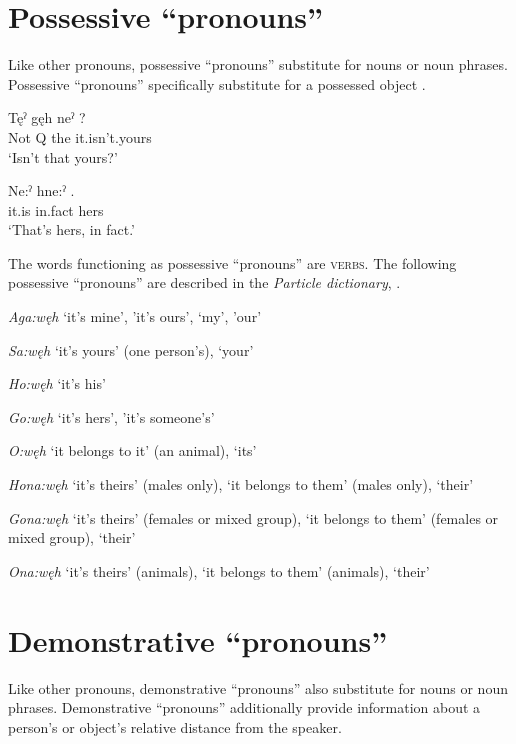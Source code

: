 \section{Possessive “pronouns”} \label{ch:’Possessive pronouns’}
Like other pronouns, possessive “pronouns” substitute for nouns or noun phrases. Possessive “pronouns” specifically substitute for a possessed object . 

\ea\label{ex:poss}
\ea 
 \gll Tęˀ gęh neˀ ? \\
Not Q the it.isn’t.yours\\
\glt ‘Isn’t that yours?’

\ex 
 \gll Ne:ˀ hne:ˀ .\\
it.is in.fact hers\\
\glt ‘That’s hers, in fact.’
\z
\z 

The words functioning as possessive “pronouns” are \textsc{verbs}. The following possessive “pronouns” are described in the \textit{Particle dictionary}, . 

\begin{CayugaRelated}

\item{} \textit{Aga:węh} ‘it's mine’, 'it's ours’, ‘my', 'our’\\
\item{} \textit{Sa:węh} ‘it's yours’ (one person’s), ‘your’\\
\item{} \textit{Ho:węh} ‘it's his’\\
\item{} \textit{Go:węh} ‘it's hers’, 'it's someone’s’\\
\item{} \textit{O:węh} ‘it belongs to it’ (an animal), ‘its’\\
\item{} \textit{Hona:węh} ‘it's theirs’ (males only), ‘it belongs to them’ (males only), ‘their’\\
\item{} \textit{Gona:węh} ‘it's theirs’ (females or mixed group), ‘it belongs to them’ (females or mixed group), ‘their’\\
\item{} \textit{Ona:węh} ‘it's theirs’ (animals), ‘it belongs to them’ (animals), ‘their’
\end{CayugaRelated}


\section{Demonstrative “pronouns”} \label{ch:’Demonstrative pronouns’}
Like other pronouns, demonstrative “pronouns”  also substitute for nouns or noun phrases. Demonstrative “pronouns” additionally provide information about a person’s or object’s relative distance from the speaker. 

